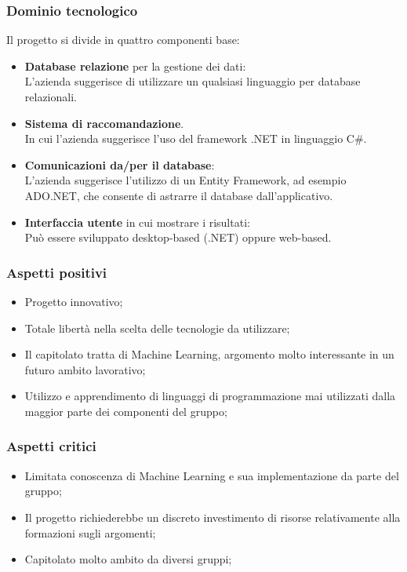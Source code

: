 \documentclass[a4paper, 11pt]{article}
\begin{document}
\subsubsection{Dominio tecnologico}
Il progetto si divide in quattro componenti base:
\begin{itemize}
    \item \textbf{Database relazione} per la gestione dei dati: \\
        L'azienda suggerisce di utilizzare un qualsiasi linguaggio per database relazionali.
    \item \textbf{Sistema di raccomandazione}. \\
        In cui l'azienda suggerisce l'uso del framework .NET in linguaggio C\#.
    \item \textbf{Comunicazioni da/per il database}: \\
        L'azienda suggerisce l'utilizzo di un Entity Framework, ad esempio ADO.NET, che consente di astrarre il database dall'applicativo.
    \item \textbf{Interfaccia utente} in cui mostrare i risultati: \\
        Può essere sviluppato desktop-based (.NET) oppure web-based.
\end{itemize}

\pagebreak
\subsubsection{Aspetti positivi}
\begin{itemize}
    \item Progetto innovativo;
    \item Totale libertà nella scelta delle tecnologie da utilizzare;
    \item Il capitolato tratta di Machine Learning, argomento molto interessante in un futuro ambito lavorativo;
    \item Utilizzo e apprendimento di linguaggi di programmazione mai utilizzati dalla maggior parte dei componenti del gruppo;
\end{itemize}

\subsubsection{Aspetti critici}
\begin{itemize}
    \item Limitata conoscenza di Machine Learning e sua implementazione da parte del gruppo;
    \item Il progetto richiederebbe un discreto investimento di risorse relativamente alla formazioni sugli argomenti;
    \item Capitolato molto ambito da diversi gruppi;
\end{itemize}
\end{document}
